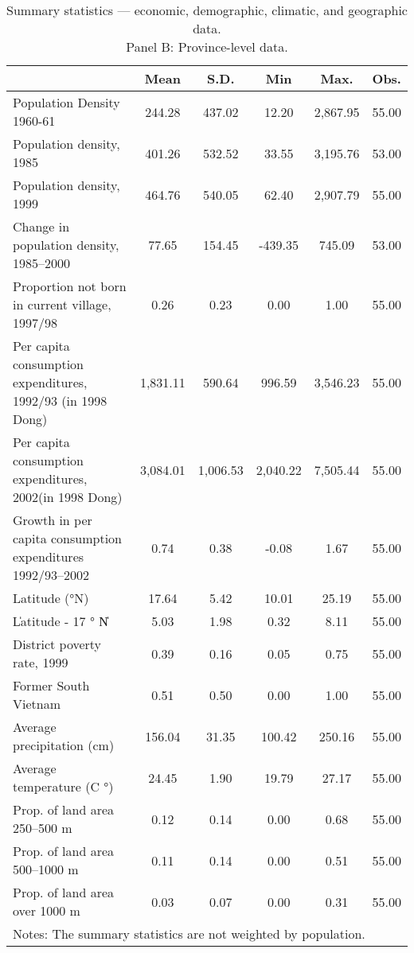\begin{table}[htbp]\centering
\def\sym#1{\ifmmode^{#1}\else\(^{#1}\)\fi}
\caption{Summary statistics — economic, demographic, climatic, and geographic data. \\ Panel B: Province-level data.}
\begin{tabular}{l*{1}{ccccc}}
\toprule
                    &        Mean&        S.D.&         Min&        Max.&        Obs.\\
\midrule
Population Density 1960-61&      244.28&      437.02&       12.20&    2,867.95&       55.00\\
Population density, 1985&      401.26&      532.52&       33.55&    3,195.76&       53.00\\
Population density, 1999&      464.76&      540.05&       62.40&    2,907.79&       55.00\\
Change in population density, 1985–2000&       77.65&      154.45&     -439.35&      745.09&       53.00\\
Proportion not born in current village, 1997/98&        0.26&        0.23&        0.00&        1.00&       55.00\\
Per capita consumption expenditures, 1992/93 (in 1998 Dong)&    1,831.11&      590.64&      996.59&    3,546.23&       55.00\\
Per capita consumption expenditures, 2002(in 1998 Dong)&    3,084.01&    1,006.53&    2,040.22&    7,505.44&       55.00\\
Growth in per capita consumption expenditures 1992/93–2002&        0.74&        0.38&       -0.08&        1.67&       55.00\\
Latitude (°N)       &       17.64&        5.42&       10.01&       25.19&       55.00\\
\|Latitude - 17 $°$ N\|&        5.03&        1.98&        0.32&        8.11&       55.00\\
District poverty rate, 1999&        0.39&        0.16&        0.05&        0.75&       55.00\\
Former South Vietnam&        0.51&        0.50&        0.00&        1.00&       55.00\\
Average precipitation (cm)&      156.04&       31.35&      100.42&      250.16&       55.00\\
Average temperature (C $°$)&       24.45&        1.90&       19.79&       27.17&       55.00\\
Prop. of land area 250–500 m&        0.12&        0.14&        0.00&        0.68&       55.00\\
Prop. of land area 500–1000 m&        0.11&        0.14&        0.00&        0.51&       55.00\\
Prop. of land area over 1000 m&        0.03&        0.07&        0.00&        0.31&       55.00\\
\bottomrule
\multicolumn{6}{l}{\footnotesize Notes: The summary statistics are not weighted by population.}\\
\end{tabular}
\end{table}
